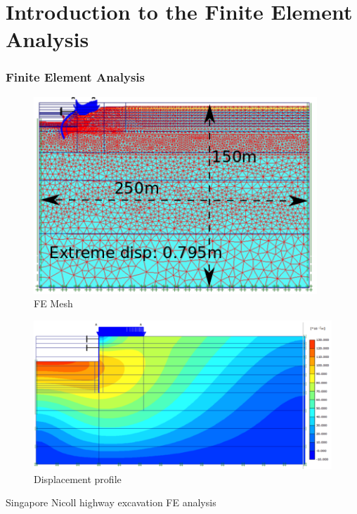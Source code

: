 \documentclass[beamer]{beamer}
\begin{document}
\section{Introduction to the Finite Element Analysis}
\begin{frame}
\frametitle{Finite Element Analysis}
 \noindent
\fboxsep=0pt
\noindent
\begin{minipage}[t]{0.42\linewidth}
	\begin{figure}
		\includegraphics[width=0.95\textwidth]{figs/fea-geotech-mesh.png}
		\caption{FE Mesh}
	\end{figure}
\end{minipage}%
\hfill
\begin{minipage}[t]{0.56\linewidth}
	\begin{figure}
		\includegraphics[width=\textwidth]{figs/fea-geotech.png}
		\caption{Displacement profile}
	\end{figure}
\end{minipage}
\centering
Singapore Nicoll highway excavation FE analysis
\end{frame}
\end{document}
